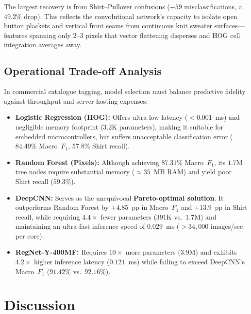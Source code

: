 \documentclass[conference]{IEEEtran}
\begin{document}
The largest recovery is from Shirt--Pullover confusions ($-59$ misclassifications, a $49.2\%$ drop). This reflects the convolutional network's capacity to isolate open button plackets and vertical front seams from continuous knit sweater surfaces---features spanning only $2$--$3$ pixels that vector flattening disperses and HOG cell integration averages away.

\subsection{Operational Trade-off Analysis}
In commercial catalogue tagging, model selection must balance predictive fidelity against throughput and server hosting expenses:
\begin{itemize}
    \item \textbf{Logistic Regression (HOG):} Offers ultra-low latency ($<0.001$~ms) and negligible memory footprint ($3.2\text{K}$ parameters), making it suitable for embedded microcontrollers, but suffers unacceptable classification error ($84.49\%$ Macro~$F_1$, $57.8\%$ Shirt recall).
    \item \textbf{Random Forest (Pixels):} Although achieving $87.31\%$ Macro~$F_1$, its $1.7\text{M}$ tree nodes require substantial memory (${\approx}35$~MB RAM) and yield poor Shirt recall ($59.3\%$).
    \item \textbf{DeepCNN:} Serves as the unequivocal \textbf{Pareto-optimal solution}. It outperforms Random Forest by $+4.85$~pp in Macro~$F_1$ and $+13.9$~pp in Shirt recall, while requiring $4.4\times$ fewer parameters ($391\text{K}$ vs.\ $1.7\text{M}$) and maintaining an ultra-fast inference speed of $0.029$~ms ($>34{,}000$ images/sec per core).
    \item \textbf{RegNet-Y-400MF:} Requires $10\times$ more parameters ($3.9\text{M}$) and exhibits $4.2\times$ higher inference latency ($0.121$~ms) while failing to exceed DeepCNN's Macro~$F_1$ ($91.42\%$ vs.\ $92.16\%$).
\end{itemize}

\section{Discussion}\label{sec:discussion}
\end{document}
